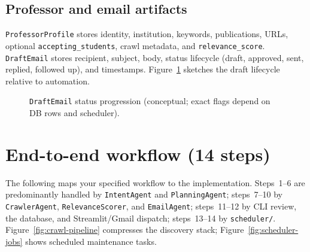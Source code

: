 \documentclass[11pt,a4paper]{article}
\begin{document}
\subsection{Professor and email artifacts}
\texttt{ProfessorProfile} stores identity, institution, keywords, publications, URLs, optional \texttt{accepting\_students}, crawl metadata, and \texttt{relevance\_score}. \texttt{DraftEmail} stores recipient, subject, body, status lifecycle (draft, approved, sent, replied, followed up), and timestamps. Figure~\ref{fig:email-lifecycle} sketches the draft lifecycle relative to automation.

\begin{figure}[htbp]
\centering
{}
\caption{\texttt{DraftEmail} status progression (conceptual; exact flags depend on DB rows and scheduler).}
\label{fig:email-lifecycle}
\end{figure}

\section{End-to-end workflow (14 steps)}

The following maps your specified workflow to the implementation. Steps~1--6 are predominantly handled by \texttt{IntentAgent} and \texttt{PlanningAgent}; steps~7--10 by \texttt{CrawlerAgent}, \texttt{RelevanceScorer}, and \texttt{EmailAgent}; steps~11--12 by CLI review, the database, and Streamlit/Gmail dispatch; steps~13--14 by \texttt{scheduler/}. Figure~\ref{fig:crawl-pipeline} compresses the discovery stack; Figure~\ref{fig:scheduler-jobs} shows scheduled maintenance tasks.
\end{document}
